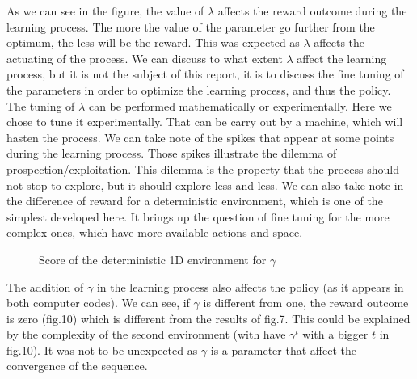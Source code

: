 \documentclass[conference]{IEEEtran}
\begin{document}
As we can see in the figure, the value of $\lambda$ affects the reward outcome during the learning process. The more the value of the parameter go further from the optimum, the less will be the reward. This was expected as $\lambda$ affects the actuating of the process. We can discuss to what extent $\lambda$ affect the learning process, but it is not the subject of this report, it is to discuss the fine tuning of the parameters in order to optimize the learning process, and thus the policy. The tuning of $\lambda$ can be performed mathematically or experimentally. Here we chose to tune it experimentally. That can be carry out by a machine, which will hasten the process.
We can take note of the spikes that appear at some points during the learning process. Those spikes illustrate the dilemma of prospection/exploitation. This dilemma is the property that the process should not stop to explore, but it should explore less and less.
We can also take note in the difference of reward for a deterministic environment, which is one of the simplest developed here. It brings up the question of fine tuning for the more complex ones, which have more available actions and space.\\

\begin{figure}
\caption{Score of the deterministic 1D environment for $\gamma$}
\end{figure}

 
The addition of $\gamma$ in the learning process also affects the policy (as it appears in both computer codes). We can see, if $\gamma$ is different from one, the reward outcome is zero (fig.10) which is different from the results of fig.7. This could be explained by the complexity of the second environment (with have $\gamma^t$ with a bigger $t$ in fig.10). It was not to be unexpected as $\gamma$ is a parameter that affect the convergence of the sequence.\\
\end{document}
